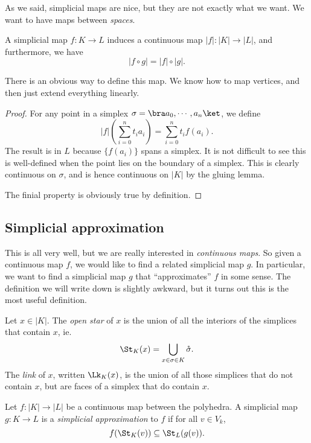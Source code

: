 \documentclass[a4paper]{article}
\begin{document}
As we said, simplicial maps are nice, but they are not exactly what we want. We want to have maps between \emph{spaces}.
\begin{lemma}
  A simplicial map $f: K \to L$ induces a continuous map $|f|: |K|\to |L|$, and furthermore, we have
  \[
    |f\circ g| = |f|\circ |g|.
  \]
\end{lemma}
There is an obvious way to define this map. We know how to map vertices, and then just extend everything linearly.
\begin{proof}
  For any point in a simplex $\sigma = \bra a_0,\cdots, a_n\ket$, we define
  \[
    |f|\left(\sum_{i = 0}^n t_i a_i\right) = \sum_{i = 0}^n t_i f(a_i).
  \]
  The result is in $L$ because $\{f(a_i)\}$ spans a simplex. It is not difficult to see this is well-defined when the point lies on the boundary of a simplex. This is clearly continuous on $\sigma$, and is hence continuous on $|K|$ by the gluing lemma.

  The finial property is obviously true by definition.
\end{proof}

\subsection{Simplicial approximation}
This is all very well, but we are really interested in \emph{continuous maps}. So given a continuous map $f$, we would like to find a related simplicial map $g$. In particular, we want to find a simplicial map $g$ that ``approximates'' $f$ in some sense. The definition we will write down is slightly awkward, but it turns out this is the most useful definition.

\begin{defi}
  Let $x \in |K|$. The \emph{open star} of $x$ is the union of all the interiors of the simplices that contain $x$, ie.
  \[
    \St_K(x) = \bigcup_{x \in \sigma \in K} \mathring{\sigma}.
  \]
  The \emph{link} of $x$, written $\Lk_K(x)$, is the union of all those simplices that do not contain $x$, but are faces of a simplex that do contain $x$.
\end{defi}

\begin{defi}
  Let $f: |K| \to |L|$ be a continuous map between the polyhedra. A simplicial map $g: K \to L$ is a \emph{simplicial approximation} to $f$ if for all $v \in V_k$,
  \[
    f(\St_K(v)) \subseteq \St_L(g(v)).
  \]
\end{defi}
\end{document}
